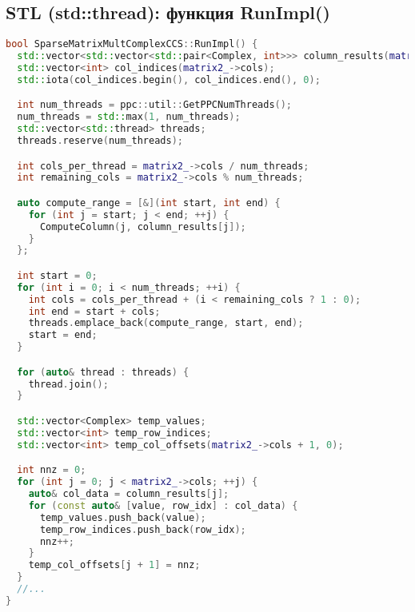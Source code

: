 \documentclass[12pt]{extarticle}
\begin{document}
\subsection*{STL (std::thread): функция RunImpl()}
\begin{lstlisting}[language=C++]
bool SparseMatrixMultComplexCCS::RunImpl() {
  std::vector<std::vector<std::pair<Complex, int>>> column_results(matrix2_->cols);
  std::vector<int> col_indices(matrix2_->cols);
  std::iota(col_indices.begin(), col_indices.end(), 0);

  int num_threads = ppc::util::GetPPCNumThreads();
  num_threads = std::max(1, num_threads);
  std::vector<std::thread> threads;
  threads.reserve(num_threads);

  int cols_per_thread = matrix2_->cols / num_threads;
  int remaining_cols = matrix2_->cols % num_threads;

  auto compute_range = [&](int start, int end) {
    for (int j = start; j < end; ++j) {
      ComputeColumn(j, column_results[j]);
    }
  };

  int start = 0;
  for (int i = 0; i < num_threads; ++i) {
    int cols = cols_per_thread + (i < remaining_cols ? 1 : 0);
    int end = start + cols;
    threads.emplace_back(compute_range, start, end);
    start = end;
  }

  for (auto& thread : threads) {
    thread.join();
  }

  std::vector<Complex> temp_values;
  std::vector<int> temp_row_indices;
  std::vector<int> temp_col_offsets(matrix2_->cols + 1, 0);

  int nnz = 0;
  for (int j = 0; j < matrix2_->cols; ++j) {
    auto& col_data = column_results[j];
    for (const auto& [value, row_idx] : col_data) {
      temp_values.push_back(value);
      temp_row_indices.push_back(row_idx);
      nnz++;
    }
    temp_col_offsets[j + 1] = nnz;
  }
  //...
}
\end{lstlisting}
\end{document}
